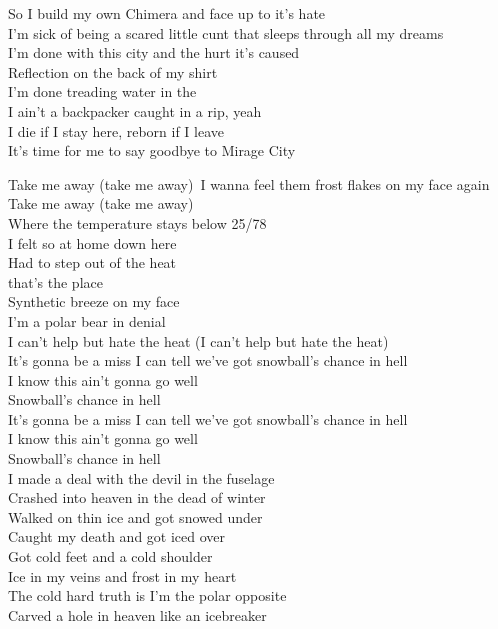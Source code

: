So I build my own Chimera and face up to it's hate \\
I'm sick of being a scared little cunt that sleeps through all my dreams \\
I'm done with this city and the hurt it's caused \\
Reflection on the back of my shirt \\
I'm done treading water in the  \\
I ain't a backpacker caught in a rip, yeah \\
I die if I stay here, reborn if I leave \\
It's time for me to say goodbye to Mirage City \\



Take me away (take me away)\
I wanna feel them frost flakes on my face again\ \\
Take me away (take me away) \\
Where the temperature stays below 25/78 \\

I felt so at home down here \\
Had to step out of the heat \\
 that's the place \\
Synthetic breeze on my face \\
I'm a polar bear in denial \\
I can't help but hate the heat (I can't help but hate the heat) \\

It's gonna be a miss I can tell we've got snowball's chance in hell \\
I know this ain't gonna go well \\
Snowball's chance in hell \\
It's gonna be a miss I can tell we've got snowball's chance in hell \\
I know this ain't gonna go well \\
Snowball's chance in hell \\

I made a deal with the devil in the fuselage \\
Crashed into heaven in the dead of winter \\
Walked on thin ice and got snowed under \\
Caught my death and got iced over \\
Got cold feet and a cold shoulder \\
Ice in my veins and frost in my heart \\
The cold hard truth is I'm the polar opposite \\
Carved a hole in heaven like an icebreaker \\


